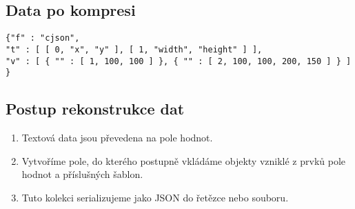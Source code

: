 \subsection{Data po kompresi}
\label{cjsonPoKompresi}
\texttt{\{\hspace*{3mm}"f" : "cjson",\\
\hspace*{5mm}"t" : [ [ 0, "x", "y" ], [ 1, "width", "height" ] ],\\
\hspace*{5mm}"v" : [ \{ "" : [ 1, 100, 100 ] \}, \{ "" : [ 2, 100, 100, 200, 150 ] \} ] \}}

\subsection{Postup rekonstrukce dat}
\begin{enumerate}
\item Textová data jsou převedena na pole hodnot.
\item Vytvoříme pole, do kterého postupně vkládáme objekty vzniklé z prvků pole hodnot a příslušných šablon.
\item Tuto kolekci serializujeme jako JSON do řetězce nebo souboru.
\end{enumerate}